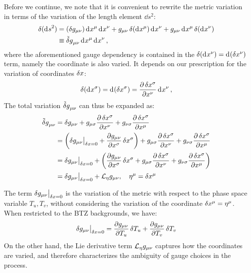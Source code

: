 \documentclass[12pt,a4paper,utf8]{article}
\newcommand{\tvar}[1]{\mathinner{\tilde{\delta} #1}}
\begin{document}
	Before we continue, we note that it is convenient to rewrite the metric variation in terms of the variation of the length element $\dd{s}^2$: 
	\begin{equation}
	\begin{aligned}
		\var{(\dd{s}^2)}
		&= (\var{g_{\mu\nu}}) \dd{x^\mu} \dd{x^\nu}
			+ g_{\mu\nu} \var{(\dd{x^\mu})} \dd{x^\nu}
			+ g_{\mu\nu} \dd{x^\mu} \var{(\dd{x^\nu})} \\
		&\equiv \tvar{g}_{\mu\nu} \dd{x^\mu} \dd{x^\nu},
	\end{aligned}
	\end{equation}
	where the aforementioned gauge dependency is contained in the $\mathinner{\delta (\mathinner{\mathrm{d}^{}x^\nu})} = \mathinner{\mathrm{d}^{}(\mathinner{\delta x^\nu})}$ term, namely the coordinate is also varied. It depends on our prescription for the variation of coordinates $\mathinner{\delta x}$:
	\begin{equation}
		\mathinner{\delta (\mathinner{\mathrm{d}^{}x^\sigma})}
		= \mathinner{\mathrm{d}^{}(\mathinner{\delta x^\sigma})}
		= \frac{\partial{\,\mathinner{\delta x^\sigma}}}{\partial{x^\nu}} \mathinner{\mathrm{d}^{}x^\nu},
	\end{equation}
	The total variation $\tvar{g}_{\mu\nu}$ can thus be expanded as:
	\begin{equation}
	\begin{aligned}
		\tvar{g}_{\mu\nu}
		&= \delta g_{\mu\nu}
			+ g_{\mu\sigma}
				\pdv{\,\var{x^\sigma}}{x^\nu}
			+ g_{\nu\sigma}
				\pdv{\,\var{x^\sigma}}{x^\mu}
	\\[.3ex]
		&= \pqty{
			\delta g_{\mu\nu}\big|_{\var{x} = 0}
			+ \pdv{g_{\mu\nu}}{x^\sigma} \var{x^\sigma}
		}
			+ g_{\mu\sigma}
				\pdv{\,\var{x^\sigma}}{x^\nu}
			+ g_{\nu\sigma}
				\pdv{\,\var{x^\sigma}}{x^\mu}
	\\[.3ex]
		&= \delta g_{\mu\nu}\big|_{\var{x} = 0}
			+ \pqty{
				\pdv{g_{\mu\nu}}{x^\sigma} \var{x^\sigma}
				+ g_{\mu\sigma}
					\pdv{\,\var{x^\sigma}}{x^\nu}
				+ g_{\nu\sigma}
					\pdv{\,\var{x^\sigma}}{x^\mu}
			}
	\\[.3ex]
		&= \delta g_{\mu\nu}\big|_{\var{x} = 0}
			+ \ldv{\eta} g_{\mu\nu},
	\quad \eta^\mu = \var{x^\mu}
	\end{aligned}
	\label{eq:metric_variation}
	\end{equation}
	
	The term $\delta g_{\mu\nu}\big|_{\mathinner{\delta x} = 0}$ is the variation of the metric with respect to the phase space variable $T_u,T_v$, without considering the variation of the coordinate $\mathinner{\delta x^\mu} = \eta^\mu$. When restricted to the BTZ backgrounds, we have:
	\begin{equation}
		\delta g_{\mu\nu}\big|_{\mathinner{\delta x} = 0}
		= \frac{\partial{g_{\mu\nu}}}{\partial{T_u}} \mathinner{\delta T_u}
			+ \frac{\partial{g_{\mu\nu}}}{\partial{T_v}} \mathinner{\delta T_v}
	\end{equation}
	On the other hand, the Lie derivative term $\mathcal{L}_{\mathnormal{\eta}} g_{\mu\nu}$ captures how the coordinates are varied, and therefore characterizes the ambiguity of gauge choices in the process. 
	
\end{document}
